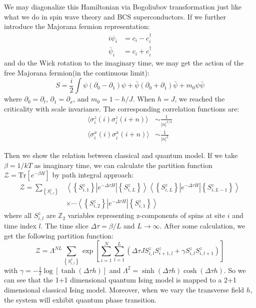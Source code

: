 \documentclass{article}
\theoremstyle{plain} \newtheorem{thm}{Theorem}[section]
\theoremstyle{definition} \newtheorem{df}{Definition}[section]
\theoremstyle{definition} \newtheorem{eg}{Example}
\theoremstyle{remark} \newtheorem*{rmk}{Remark}
\begin{document}
	We may diagonalize this Hamiltonian via Bogoliubov transformation just like what we do in spin wave theory and BCS superconductors. If we further introduce the Majorana fermion representation:
	\begin{equation}
	\begin{align}
	i\psi_i&=c_i-c_i^{\dagger}\\
	\bar{\psi}_i&=c_i+c_i^{\dagger}
	\end{align}
	\end{equation}
	and do the Wick rotation to the imaginary time, we may get the action of the free Majorana fermion(in the continuous limit):
	\begin{equation}
		S=\frac{i}{2}\int\psi(\partial_0-\partial_1)\psi+\bar{\psi}(\partial_0+\partial_1)\bar{\psi}+m_0\psi\bar{\psi}
	\end{equation}
	where $\partial_0=\partial_t$, $\partial_1=\partial_x$, and $m_0=1-h/J$. When $h=J$, we reached the criticality with scale invariance. The corresponding correlation functions are:
	\begin{equation}
    \begin{align}
	  \langle \sigma_i^z(i)\sigma_i^z(i+n)\rangle&\sim\frac{1}{|n|^{1/4}}\\	
	  \langle \sigma_i^x(i)\sigma_i^x(i+n)\rangle&\sim\frac{1}{|n|^2}
    \end{align}
	\end{equation}
	
	Then we show the relation between classical and quantum model. If we take $\beta=1/kT$ as imaginary time, we can calculate the partition function $\mathcal{Z}=\mathrm{Tr}[e^{-\beta H}]$ by path integral approach:
	\begin{equation}
	\begin{aligned}
	\mathcal{Z}=\sum_{\left\lbrace S^z_{i,l}\right\rbrace }&\left\langle \left\lbrace S_{i,1}^z\right\rbrace\right|e^{-\Delta\tau H}\left|\left\lbrace S_{i,L}^z\right\rbrace\right\rangle\left\langle \left\lbrace S_{i,L}^z\right\rbrace\left|e^{-\Delta\tau H}\right|\left\lbrace S_{i,L-1}^z\right\rbrace\right\rangle \\
	&\times\cdots\left\langle \left\lbrace S_{i,2}^z\right\rbrace\left|e^{-\Delta\tau H}\right|\left\lbrace S_{i,1}^z\right\rbrace\right\rangle
	\end{aligned}
	\end{equation}
	where all $S^z_{i,l}$ are $\mathbb{Z}_2$ variables representing z-components of spins at site $i$ and time index $l$. The time slice $\Delta\tau=\beta/L$ and $L \to \infty$. After some calculation, we get the following partition function:
	\begin{equation}
	\mathcal{Z}=\Lambda^{NL}\sum_{\left\lbrace S^z_{i,l}\right\rbrace }\exp\left[\sum_{i=1}^N\sum_{l=1}^L\left(\Delta\tau JS^z_{i,l}S^z_{i+1,l}+\gamma S^z_{i,l}S^z_{i,l+1}\right)\right]
	\end{equation}
	with $\gamma=-\frac{1}{2}\log[ \tanh(\Delta\tau h) ]$ and $\Lambda^2=\sinh(\Delta\tau h)\cosh(\Delta\tau h)$. So we can see that the 1+1 dimensional quantum Ising model is mapped to a 2+1 dimensional classical Ising model. Moreover, when we vary the transverse field $h$, the system will exhibit quantum phase transition.
	
\end{document}
